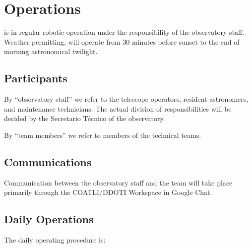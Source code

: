 \chapter{Operations}
\label{chapter:operations}

{\projectname} is in regular robotic operation under the responsibility of the observatory staff. Weather permitting, {\projectname} will operate from 30 minutes before sunset to the end of morning astronomical twilight.

\section{Participants}

By “observatory staff” we refer to the telescope operators, resident astronomers, and maintenance technicians. The actual division of responsibilities will be decided by the Secretario Técnico of the observatory.

By “team members” we refer to members of the {\projectname} technical teams.

\section{Communications}

Communication between the observatory staff and the team will take place primarily through the COATLI/DDOTI Workspace in Google Chat.

\section{Daily Operations}

The daily operating procedure is:

